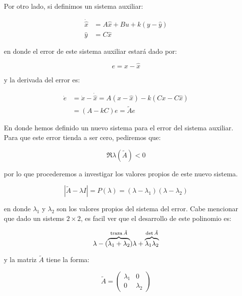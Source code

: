 		Por otro lado, si definimos un sistema auxiliar:

		\begin{align*}
			\dot{\hat{x}} &= A \hat{x} + B u + k (y - \hat{y}) \\
			\hat{y} &= C \hat{x}
		\end{align*}

		en donde el error de este sistema auxiliar estará dado por:

		\begin{equation*}
			e = x - \hat{x}
		\end{equation*}

		y la derivada del error es:

		\begin{align*}
			\dot{e} &= \dot{x} - \dot{\hat{x}} = A(x - \hat{x}) - k (Cx - C\hat{x}) \\
			&= (A - k C) e = \tilde{A} e
		\end{align*}

		En donde hemos definido un nuevo sistema para el error del sistema auxiliar.
		Para que este error tienda a ser cero, pediremos que:

		\begin{equation*}
			\Re{\lambda(\tilde{A})} < 0
		\end{equation*}

		por lo que procederemos a investigar los valores propios de este nuevo sistema.

		\begin{equation*}
			|\tilde{A} - \lambda I| = P(\lambda) = (\lambda - \lambda_1) (\lambda - \lambda_2)
		\end{equation*}

		en donde $\lambda_1$ y $\lambda_2$ son los valores propios del sistema del error.
		Cabe mencionar que dado un sistems $2 \times 2$, es facil ver que el desarrollo de este polinomio es:

		\begin{equation*}
			\lambda - (\overbrace{\lambda_1 + \lambda_2}^{\operatorname{traza}{\tilde{A}}}) \lambda + \overbrace{\lambda_1 \lambda_2}^{\det{\tilde{A}}}
		\end{equation*}

		y la matriz $\tilde{A}$ tiene la forma:

		\begin{equation*}
			\tilde{A} =
			\begin{pmatrix}
				\lambda_1 & 0 \\
				0 & \lambda_2
			\end{pmatrix}
		\end{equation*}

